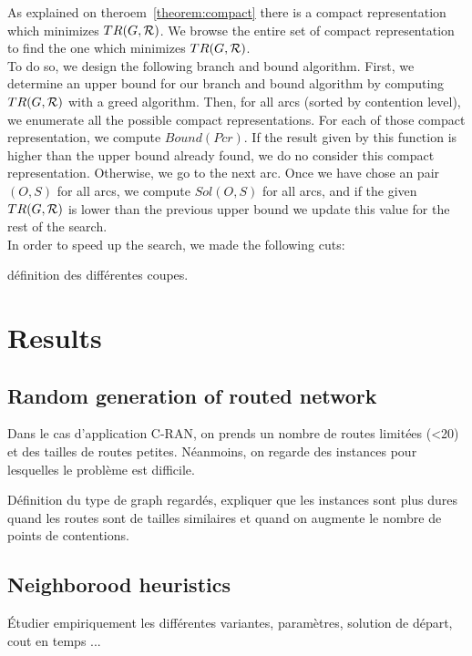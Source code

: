 \documentclass[english]{article}
\begin{document}
 As explained on theroem~\ref{theorem:compact} there is a compact representation which minimizes $TR(G,{\cal R})$. We browse the entire set of compact representation to find the one which minimizes $TR(G,{\cal R})$.\\
 To do so, we design the following branch and bound algorithm. First, we determine an upper bound for our branch and bound algorithm by computing $TR(G,{\cal R})$ with a greed algorithm. Then, for all arcs (sorted by contention level), we enumerate all the possible compact representations. For each of those compact representation, we compute $Bound(Pcr)$. If the result given by this function is higher than the upper bound already found, we do no consider this compact representation. Otherwise, we go to the next arc. Once we have chose an pair $(O,S)$ for all arcs, we compute $Sol(O,S)$ for all arcs, and if the given $TR(G,{\cal R})$ is lower than the previous upper bound we update this value for the rest of the search.\\


In order to speed up the search, we made the following cuts:

définition des différentes coupes.\\

\section{Results}




\subsection{Random generation of routed network}
Dans le cas d'application C-RAN, on prends un nombre de routes limitées (<20) et des tailles de routes petites. Néanmoins, on regarde des instances pour lesquelles le problème est difficile.\

Définition du type de graph regardés, expliquer que les instances sont plus dures quand les routes sont de tailles similaires et quand on augmente le nombre de points de contentions.\\

\subsection{Neighborood heuristics}

Étudier empiriquement les différentes variantes, paramètres, solution de départ, cout en temps ...
\end{document}

